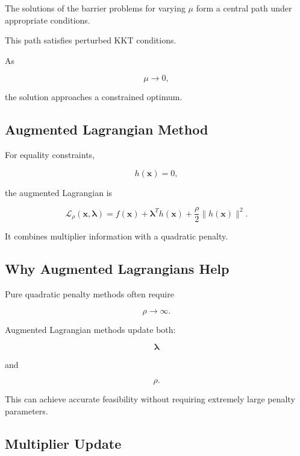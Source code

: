 The solutions of the barrier problems for varying \(\mu\) form a central
path under appropriate conditions.

This path satisfies perturbed KKT conditions.

As

\[
\boxed{
\mu\to0,
}
\]

the solution approaches a constrained optimum.

\subsection{Augmented Lagrangian Method}
\label{subsec:augmented-lagrangian}

For equality constraints,

\[
h(\mathbf{x})=0,
\]

the augmented Lagrangian is

\[
\boxed{
\mathcal{L}_\rho
(
\mathbf{x},
\boldsymbol{\lambda}
)
=
f(\mathbf{x})
+
\boldsymbol{\lambda}^T
h(\mathbf{x})
+
\frac{\rho}{2}
\|
h(\mathbf{x})
\|^2.
}
\]

It combines multiplier information with a quadratic penalty.

\subsection{Why Augmented Lagrangians Help}
\label{subsec:why-augmented-lagrangian}

Pure quadratic penalty methods often require

\[
\rho\to\infty.
\]

Augmented Lagrangian methods update both:

\[
\boxed{
\boldsymbol{\lambda}
}
\]

and

\[
\boxed{
\rho.
}
\]

This can achieve accurate feasibility without requiring extremely large
penalty parameters.

\subsection{Multiplier Update}
\label{subsec:augmented-lagrangian-multiplier-update}


